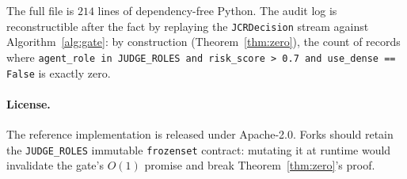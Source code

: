 \documentclass[10pt,twocolumn]{article}
\newcommand{\code}[1]{\texttt{\small #1}}
\begin{document}
The full file is $214$ lines of dependency-free Python. The audit
log is reconstructible after the fact by replaying the
\code{JCRDecision} stream against Algorithm~\ref{alg:gate}: by
construction (Theorem~\ref{thm:zero}), the count of records where
\code{agent\_role in JUDGE\_ROLES and risk\_score > 0.7 and
use\_dense == False} is exactly zero.

\paragraph{License.} The reference implementation is released under
Apache-2.0. Forks should retain the \code{JUDGE\_ROLES} immutable
\code{frozenset} contract: mutating it at runtime would invalidate
the gate's $O(1)$ promise and break Theorem~\ref{thm:zero}'s proof.



\end{document}

